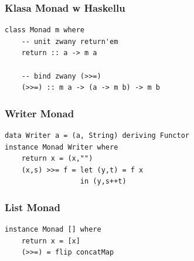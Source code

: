 \documentclass[14pt]{beamer}
\begin{document}
\begin{frame}[fragile]
\frametitle{Klasa Monad w Haskellu}
\begin{verbatim}
class Monad m where
    -- unit zwany return'em
    return :: a -> m a

    -- bind zwany (>>=)
    (>>=) :: m a -> (a -> m b) -> m b
\end{verbatim}
\end{frame}

\begin{frame}[fragile]
\frametitle{Writer Monad}
\begin{verbatim}
data Writer a = (a, String) deriving Functor
instance Monad Writer where
    return x = (x,"")
    (x,s) >>= f = let (y,t) = f x
                  in (y,s++t)
\end{verbatim}
\end{frame}

\begin{frame}[fragile]
\frametitle{List Monad}
\begin{verbatim}
instance Monad [] where
    return x = [x]
    (>>=) = flip concatMap
\end{verbatim}
\end{frame}
\end{document}
